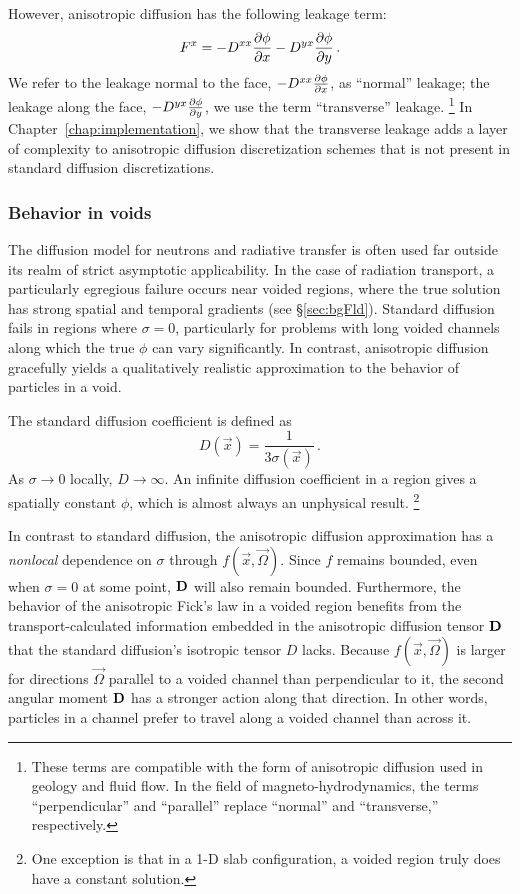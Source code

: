 However, anisotropic diffusion has the following leakage term:
\begin{equation*}
  F^x = - D^{xx} \frac{\partial \phi}{\partial x} - D^{yx} \frac{\partial \phi}{\partial y}\,.
\end{equation*}
We refer to the leakage normal to the face, $- D^{xx} \frac{\partial \phi}{\partial x}$, as
``normal'' leakage; the leakage along the face, $- D^{yx}
\frac{\partial \phi}{\partial y}$, we use the term ``transverse'' leakage.%
\footnote{%
These terms are compatible with the form of anisotropic diffusion used in
geology and fluid flow. In the field of magneto-hydrodynamics, the terms
``perpendicular'' and ``parallel'' replace ``normal'' and ``transverse,''
respectively.
}
In Chapter~\ref{chap:implementation}, we show that the transverse leakage adds a
layer of
complexity to anisotropic diffusion discretization schemes that is not present
in standard diffusion discretizations.

\subsubsection{Behavior in voids}\label{sec:adVoids}

The diffusion model for neutrons and radiative transfer is often used far
outside its realm of strict asymptotic applicability. In the case of radiation
transport, a particularly egregious failure occurs near voided regions, where
the true solution has strong spatial and temporal gradients (see
\S\ref{sec:bgFld}). Standard diffusion fails in regions where $\sigma=0$,
particularly for problems with long voided channels along which the true $\phi$
can vary significantly.
In contrast, anisotropic diffusion gracefully yields a qualitatively realistic
approximation to the behavior of particles in a void.

The standard diffusion coefficient is defined as
\begin{equation*}
  D(\vec{x}) = \frac{1}{3\sigma(\vec{x})} \,.
\end{equation*}
As $\sigma\to0$ locally, $D\to \infty$. An infinite diffusion coefficient in a
region gives a spatially constant $\phi$, which is almost always an
unphysical result.%
\footnote{%
One exception is that in a 1-D slab configuration, a voided region truly does
have a constant solution.}

In contrast to standard diffusion, the anisotropic diffusion approximation has
a \emph{nonlocal} dependence on $\sigma$ through $f(\vec{x}, \vec{\Omega})$.
Since $f$ remains bounded, even when $\sigma=0$ at some point, $\mathbf{D}$ will
also remain bounded. Furthermore, the behavior of the anisotropic Fick's law in
a voided region benefits from the transport-calculated information embedded in
the anisotropic diffusion tensor $\mathbf{D}$ that the standard diffusion's
isotropic tensor $D$ lacks. Because $f(\vec{x},\vec{\Omega})$ is larger for
directions $\vec{\Omega}$ parallel to a voided channel than perpendicular to it,
the second angular moment $\mathbf{D}$ has a stronger action along that direction.
In other words, particles in a channel prefer to travel along a voided
channel than across it.

